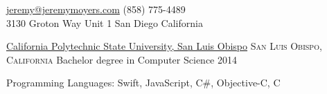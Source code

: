 \documentclass[10pt,a4paper]{article}
\begin{document}
\sloppy  %



\nobreakvspace{0.3em}  %

\noindent\href{mailto:jeremy.at.jeremymoyers.coml}{jeremy\mbox{}@\mbox{}jeremymoyers.com}\sbull
(858) 775-4489
\\
3130 Groton Way Unit 1\sbull
San Diego\thinspace {\large \sc }\sbull
California

\spacedhrule{0.9em}{-0.4em}  %


\headedsection
  {\href{https://www.calpoly.edu}{California Polytechnic State University, San Luis Obispo}}
  {\textsc{San Luis Obispo, California}} {%
  \headedsubsection
    {Bachelor degree in Computer Science}
    {2014}
    {\bodytext{}}
}
\vspace{-0.8em}


\spacedhrule{0.5em}{-0.4em}


\inlineheadsection  %
  {Programming Languages:}
  {Swift, JavaScript, C\#, Objective-C, C }

\spacedhrule{1.6em}{-0.4em}

\end{document}
